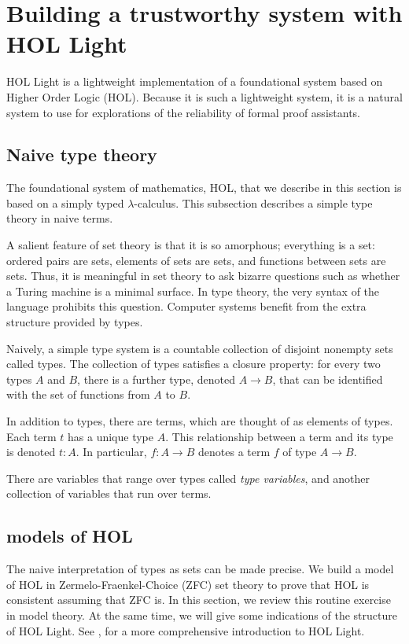 \documentclass[brochure,english,12pt]{bourbaki}
\theoremstyle{plain}
\begin{document}
\section{Building a trustworthy system with HOL Light}


HOL Light is a lightweight implementation of a foundational system
based on Higher Order Logic (HOL).  Because it is such a lightweight system,
it is a natural system to use for explorations of the reliability of formal proof assistants.



\subsection{Naive type theory}



The foundational system of mathematics, HOL, that we describe in this section is based
on a simply typed $\lambda$-calculus.  This subsection describes a simple type theory in
naive terms.  

A salient feature of set theory is that it is so amorphous; everything is a set:
ordered pairs are sets, elements of sets are sets,
and functions between sets are sets.
Thus, it is meaningful in set theory to ask bizarre questions such as whether 
a Turing machine is a minimal surface.  In type theory,
the very syntax of the language prohibits this question.  Computer systems benefit from
the extra structure provided by types.

Naively, a simple type system is a countable collection of disjoint nonempty sets called types.
The collection of types satisfies a closure property: for every two types $A$ and $B$,
there  is a further type, denoted $A\to B$, that can be  identified with the set of functions from
$A$ to $B$.  

In addition to types, there are terms, which are  thought of as elements of types.
Each term $t$ has a unique type $A$.  This relationship between a term and its type is denoted $t:A$.
In particular, $f:A\to B$ denotes a term $f$ of type $A\to B$.

There are variables that range over types called {\it type variables}, and another
collection of variables that run over terms.


\subsection{models of HOL}

The naive interpretation of types as sets can be made precise.
We build a model of HOL in Zermelo-Fraenkel-Choice (ZFC) set theory to prove that HOL is consistent assuming that ZFC is.
In this section, we review this routine exercise in model theory.  
At the same time, we will give some indications of the structure of HOL Light.
See \cite{harrison2009hol}, for a more comprehensive introduction to HOL Light.
\end{document}
